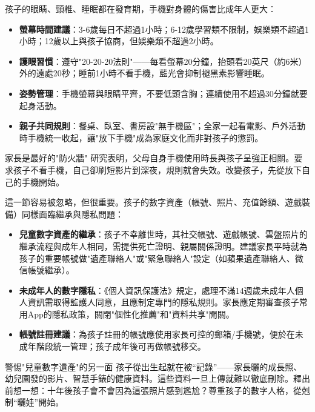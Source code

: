 
孩子的眼睛、頸椎、睡眠都在發育期，手機對身體的傷害比成年人更大：

\begin{itemize}
  \item \textbf{螢幕時間建議}：3-6歲每日不超過1小時；6-12歲學習類不限制，娛樂類不超過1小時；12歲以上與孩子協商，但娛樂類不超過2小時。
  \item \textbf{護眼習慣}：遵守"20-20-20法則"——每看螢幕20分鐘，抬頭看20英尺（約6米）外的遠處20秒；睡前1小時不看手機，藍光會抑制褪黑素影響睡眠。
  \item \textbf{姿勢管理}：手機螢幕與眼睛平齊，不要低頭含胸；連續使用不超過30分鐘就要起身活動。
  \item \textbf{親子共同規則}：餐桌、臥室、書房設"無手機區"；全家一起看電影、戶外活動時手機統一收起，讓"放下手機"成為家庭文化而非對孩子的懲罰。
\end{itemize}

\begin{tcbinfo}{家長是最好的"防火牆"}
研究表明，父母自身手機使用時長與孩子呈強正相關。要求孩子不看手機，自己卻刷短影片到深夜，規則就會失效。改變孩子，先從放下自己的手機開始。

\end{tcbinfo}


這一節容易被忽略，但很重要。孩子的數字資產（帳號、照片、充值餘額、遊戲裝備）同樣面臨繼承與隱私問題：

\begin{itemize}
  \item \textbf{兒童數字資產的繼承}：孩子不幸離世時，其社交帳號、遊戲帳號、雲盤照片的繼承流程與成年人相同，需提供死亡證明、親屬關係證明。建議家長平時就為孩子的重要帳號做"遺產聯絡人"或"緊急聯絡人"設定（如蘋果遺產聯絡人、微信帳號繼承）。
  \item \textbf{未成年人的數字隱私}：《個人資訊保護法》規定，處理不滿14週歲未成年人個人資訊需取得監護人同意，且應制定專門的隱私規則。家長應定期審查孩子常用App的隱私政策，關閉"個性化推薦"和"資料共享"開關。
  \item \textbf{帳號註冊建議}：為孩子註冊的帳號應使用家長可控的郵箱/手機號，便於在未成年階段統一管理；孩子成年後可再做帳號移交。
\end{itemize}

\begin{tcbwarn}{警惕"兒童數字遺產"的另一面}
孩子從出生起就在被“記錄”——家長曬的成長照、幼兒園發的影片、智慧手錶的健康資料。這些資料一旦上傳就難以徹底刪除。釋出前想一想：十年後孩子會不會因為這張照片感到尷尬？尊重孩子的數字人格，從剋制“曬娃”開始。

\end{tcbwarn}

